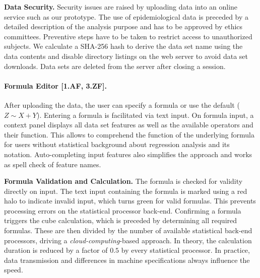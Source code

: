 \documentclass[journal]{style/vgtc} 			          %
\begin{document}

\textbf{Data Security.}
Security issues are raised by uploading data into an online service such as our prototype.
The use of epidemiological data is preceded by a detailed description of the analysis purpose and has to be approved by ethics committees.
Preventive steps have to be taken to restrict access to unauthorized subjects.
We calculate a SHA-256 hash to derive the data set name using the data contents and disable directory listings on the web server to avoid data set downloads.
Data sets are deleted from the server after closing a session.

\paragraph{Formula Editor [1.AF, 3.ZF].}
After uploading the data, the user can specify a formula or use the default ($Z \sim X + Y$).
Entering a formula is facilitated via text input.
On formula input, a context panel displays all data set features as well as the available operators and their function.
This allows to comprehend the function of the underlying formula for users without statistical background about regression analysis and its notation.
Auto-completing input features also simplifies the approach and works as spell check of feature names.

\textbf{Formula Validation and Calculation.} The formula is checked for validity directly on input.
The text input containing the formula is marked using a red halo to indicate invalid input, which turns green for valid formulas.
This prevents processing errors on the statistical processor back-end.
Confirming a formula triggers the cube calculation, which is preceded by determining all required formulas.
These are then divided by the number of available statistical back-end processors, driving a \emph{cloud-computing}-based approach.
In theory, the calculation duration is reduced by a factor of $0.5$ by every statistical processor.
In practice, data transmission and differences in machine specifications always influence the speed.
\end{document}
